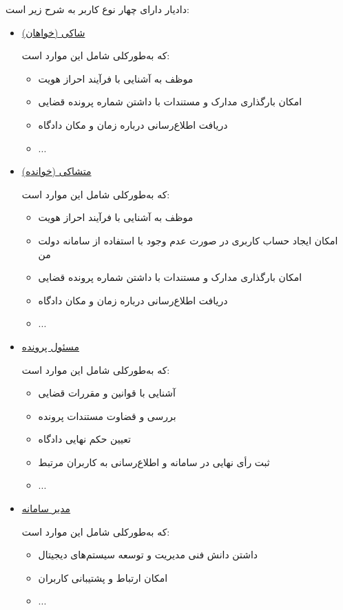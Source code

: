 \documentclass[12pt,a4paper,oneside]{article}
\begin{document}
			دادیار دارای چهار نوع کاربر به شرح زیر است: 			
			\begin{itemize}
				\item 
				\textnormal{\large \hyperref[ref:plaintiff]{شاکی (خواهان)}}
				
				که به‌طورکلی شامل این موارد است:
				\begin{itemize}
					\item 
					موظف به آشنایی با فرآیند احراز هویت
					\item 
					امکان بارگذاری مدارک و مستندات با داشتن شماره پرونده قضایی
					\item 
					دریافت اطلاع‌رسانی درباره زمان و مکان دادگاه
					\item 
					...
				\end{itemize}
			
				\item 
				\textnormal{\large \hyperref[ref:defendant]{متشاکی (خوانده)}}
				
				که به‌طورکلی شامل این موارد است:
				\begin{itemize}
					\item 
					موظف به آشنایی با فرآیند احراز هویت
					\item 
					امکان ایجاد حساب کاربری در صورت عدم وجود با استفاده از سامانه دولت من
					\item 
					امکان بارگذاری مدارک و مستندات با داشتن شماره پرونده قضایی
					\item 
					دریافت اطلاع‌رسانی درباره زمان و مکان دادگاه
					\item 
					...
				\end{itemize}
			
				\item 
				\textnormal{\large \hyperref[ref:case_officer]{مسئول پرونده}}
				
				که به‌طورکلی شامل این موارد است:
				\begin{itemize}
					\item 
					آشنایی با قوانین و مقررات قضایی
					\item 
					بررسی و قضاوت مستندات پرونده
					\item 
					تعیین حکم نهایی دادگاه
					\item 
					ثبت رأی نهایی در سامانه و اطلاع‌رسانی به کاربران مرتبط
					\item 
					...
				\end{itemize}
			
				\item 
				\textnormal{\large \hyperref[ref:admin]{مدیر سامانه}}
				
				که به‌طورکلی شامل این موارد است:
				\begin{itemize}
					\item 
					داشتن دانش فنی مدیریت و توسعه سیستم‌های دیجیتال
					\item 
					امکان ارتباط و پشتیبانی کاربران
					\item 
					...
				\end{itemize}
			\end{itemize}
			
\end{document}

